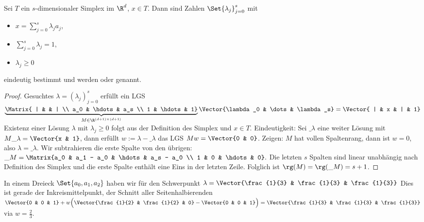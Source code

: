 \begin{lem} \label{3.58}
	Sei $T$ ein $s$-dimensionaler Simplex im $\R^d$, $x \in T$.
	Dann sind Zahlen $\Set{\lambda_j}_{j=0}^s$ mit
	\begin{itemize}
		\item
			$x = \sum_{j=0}^{s} \lambda_j a_j$,
		\item
			$\sum_{j=0}^s \lambda_j = 1$,
		\item
			$\lambda_j \ge 0$
	\end{itemize}
	eindeutig bestimmt und werden  oder  genannt.
	\begin{proof}
		Gesuchtes $\lambda = (\lambda_j)_{j=0}^s$ erfüllt ein LGS
		\begin{math}
			\underbrace{\Matrix{ | & & | \\ a_0 & \hdots & a_s \\ 1 & \hdots & 1}}_{M \in \R^{(d+1)\times (d+1)}}
			\Vector{\lambda_0 & \dots & \lambda_s}
			=
			\Vector{ | & x & | & 1}
		\end{math}
		Existenz einer Lösung $\lambda$ mit $\lambda_j \ge 0$ folgt aus der Definition des Simplex und $x \in T$.
		Eindeutigkeit:
		Sei $\_\lambda$ eine weiter Lösung mit $M \_\lambda = \Vector{x & 1}$, dann erfüllt $w := \lambda - \_\lambda$ das LGS $M w = \Vector{0 & 0}$.
		Zeigen: $M$ hat vollen Spaltenrang, dann ist $w = 0$, also $\lambda = \_\lambda$.
		Wir subtrahieren die erste Spalte von den übrigen:
		\begin{math}
			\_M
			= \Matrix{a_0 & a_1 - a_0 & \hdots & a_s - a_0 \\ 1 & 0 & \hdots & 0}.
		\end{math}
		Die letzten $s$ Spalten sind linear unabhängig nach Definition des Simplex und die erste Spalte enthält eine Eins in der letzten Zeile.
		Folglich ist $\rg(M) = \rg(\_M) = s + 1$.
	\end{proof}
\end{lem}

\begin{ex*}
	In einem Dreieck $\Set{a_0, a_1, a_2}$ haben wir für den Schwerpunkt
	\begin{math}
		\lambda = \Vector{\frac{1}{3} & \frac{1}{3} & \frac{1}{3}}
	\end{math} 
	Dies ist gerade der Inkreismittelpunkt, der Schnitt aller Seitenhalbierenden
	\begin{math}
		\Vector{0 & 0 & 1} + w \Big( \Vector{\frac{1}{2} & \frac{1}{2} & 0} - \Vector{0 & 0 & 1} \Big)
		= \Vector{\frac{1}{3} & \frac{1}{3} & \frac{1}{3}}
	\end{math}
	via $w = \frac{2}{3}$.
\end{ex*}

